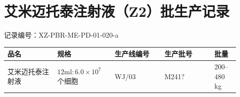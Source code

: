 \documentclass[UTF8,10pt,a4paper,fontset=fandol]{ctexart}
\newcommand{\fieldvalue}[1]{#1}
\newcommand{\handwritten}[1]{#1}
\begin{document}
\newpage

\section{艾米迈托泰注射液（Z2）批生产记录}

\noindent
记录编号：XZ-PBR-ME-PD-01-020-a

\begin{center}
\begin{tabular}{|p{0.20\linewidth}|p{0.23\linewidth}|p{0.20\linewidth}|p{0.20\linewidth}|p{0.10\linewidth}|}
\hline
品名 & 规格 & 生产线编号 & 生产批号 & 批量 \\
\hline
艾米迈托泰注射液 & $12\mathrm{ml}:6.0\times10^{7}$个细胞 &
\fieldvalue{\handwritten{WJ/03}} &
\fieldvalue{\handwritten{M241?}} &
200--480\,kg \\
\hline
\end{tabular}
\end{center}
\end{document}
